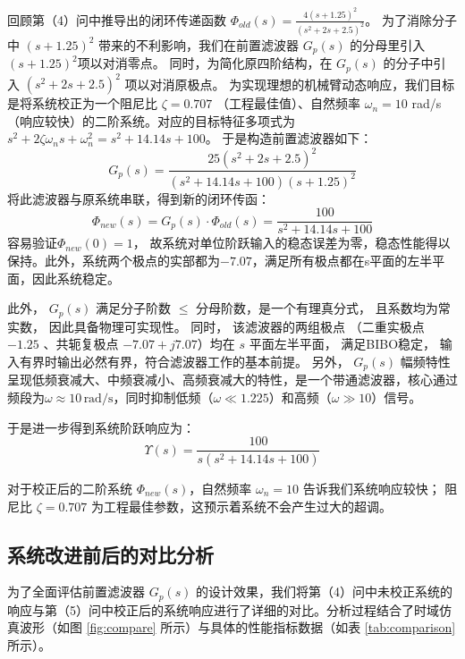 \documentclass[a4paper,zihao=-4]{article}
\numberwithin{equation}{section}
\numberwithin{figure}{section}
\numberwithin{table}{section}
\begin{document}
	回顾第（4）问中推导出的闭环传递函数 $\Phi_{old}(s) = \frac{4(s+1.25)^2}{(s^2+2s+2.5)^2}$。 为了消除分子中 $(s+1.25)^2$ 带来的不利影响，我们在前置滤波器 $G_p(s)$ 的分母里引入 $(s+1.25)^2$项以对消零点。 同时，为简化原四阶结构，在 $G_p(s)$ 的分子中引入 $(s^2+2s+2.5)^2$ 项以对消原极点。 为实现理想的机械臂动态响应，我们目标是将系统校正为一个阻尼比 $\zeta = 0.707$ （工程最佳值）、自然频率 $\omega_n = 10$ rad/s（响应较快）的二阶系统。对应的目标特征多项式为 $s^2+2\zeta \omega_n s+\omega_n^2 = s^2+14.14s+100$。 于是构造前置滤波器如下：
	\begin{equation}
		G_p(s) = \frac{25(s^2 + 2s + 2.5)^2}{(s^2+14.14s+100)(s+1.25)^2}
	\end{equation}
	将此滤波器与原系统串联，得到新的闭环传函：
	\begin{equation}
		\Phi_{new}(s) = G_p(s) \cdot \Phi_{old}(s) = \frac{100}{s^2+14.14s+100}
	\end{equation}
	容易验证$\Phi_{new}(0) = 1$， 故系统对单位阶跃输入的稳态误差为零，稳态性能得以保持。此外，系统两个极点的实部都为$-7.07$，满足所有极点都在s平面的左半平面，因此系统稳定。
	
	此外， $G_p(s)$ 满足分子阶数 $\leq$ 分母阶数，是一个有理真分式， 且系数均为常实数， 因此具备物理可实现性。 同时， 该滤波器的两组极点 （二重实极点 $-1.25$ 、共轭复极点 $-7.07 + j7.07$）均在 $s$ 平面左半平面， 满足BIBO稳定， 输入有界时输出必然有界，符合滤波器工作的基本前提。 另外， $G_p(s)$ 幅频特性呈现低频衰减大、中频衰减小、高频衰减大的特性，是一个带通滤波器，核心通过频段为\(\omega \approx 10 \, \text{rad/s}\)，同时抑制低频（\(\omega \ll 1.225\)）和高频（\(\omega \gg 10\)）信号。
	
	于是进一步得到系统阶跃响应为： 
	\begin{equation}
		\Upsilon(s) = \frac{100}{s(s^2+14.14s+100)}
	\end{equation}
	
	对于校正后的二阶系统 $\Phi_{new}(s)$，自然频率 $\omega_n = 10$ 告诉我们系统响应较快； 阻尼比 $\zeta = 0.707$ 为工程最佳参数，这预示着系统不会产生过大的超调。
	
	\subsection{系统改进前后的对比分析}
	
	为了全面评估前置滤波器 $G_p(s)$ 的设计效果，我们将第（4）问中未校正系统的响应与第（5）问中校正后的系统响应进行了详细的对比。分析过程结合了时域仿真波形（如图 \ref{fig:compare} 所示）与具体的性能指标数据（如表 \ref{tab:comparison} 所示）。
	
\end{document}
